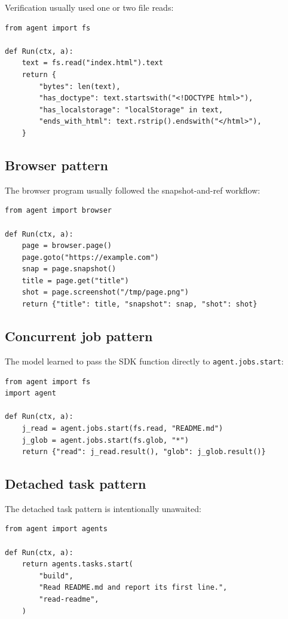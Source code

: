 \documentclass[11pt]{article}
\newcommand{\code}[1]{\texttt{#1}}
\begin{document}
Verification usually used one or two file reads:

\begin{lstlisting}[style=python]
from agent import fs

def Run(ctx, a):
    text = fs.read("index.html").text
    return {
        "bytes": len(text),
        "has_doctype": text.startswith("<!DOCTYPE html>"),
        "has_localstorage": "localStorage" in text,
        "ends_with_html": text.rstrip().endswith("</html>"),
    }
\end{lstlisting}

\subsection{Browser pattern}

The browser program usually followed the snapshot-and-ref workflow:

\begin{lstlisting}[style=python]
from agent import browser

def Run(ctx, a):
    page = browser.page()
    page.goto("https://example.com")
    snap = page.snapshot()
    title = page.get("title")
    shot = page.screenshot("/tmp/page.png")
    return {"title": title, "snapshot": snap, "shot": shot}
\end{lstlisting}

\subsection{Concurrent job pattern}

The model learned to pass the SDK function directly to
\code{agent.jobs.start}:

\begin{lstlisting}[style=python]
from agent import fs
import agent

def Run(ctx, a):
    j_read = agent.jobs.start(fs.read, "README.md")
    j_glob = agent.jobs.start(fs.glob, "*")
    return {"read": j_read.result(), "glob": j_glob.result()}
\end{lstlisting}

\subsection{Detached task pattern}

The detached task pattern is intentionally unawaited:

\begin{lstlisting}[style=python]
from agent import agents

def Run(ctx, a):
    return agents.tasks.start(
        "build",
        "Read README.md and report its first line.",
        "read-readme",
    )
\end{lstlisting}
\end{document}
